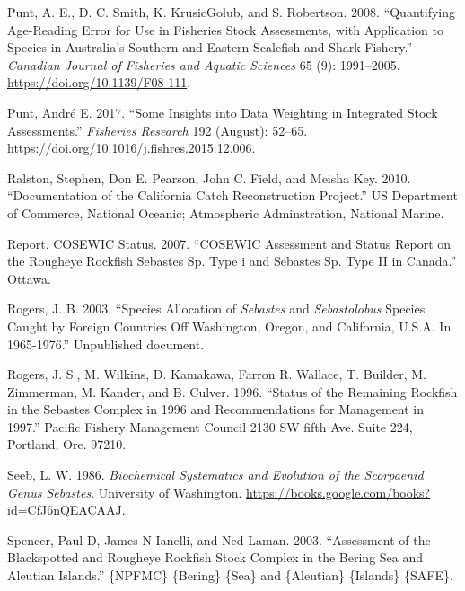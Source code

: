 \documentclass[
]{scrartcl}
\newlength{\cslhangindent}
\newenvironment{CSLReferences}[2] %
 {\begin{list}{}{%
  \setlength{\itemindent}{0pt}
  \setlength{\leftmargin}{0pt}
  \setlength{\parsep}{0pt}
  \ifodd #1
   \setlength{\leftmargin}{\cslhangindent}
   \setlength{\itemindent}{-1\cslhangindent}
  \fi
  \setlength{\itemsep}{#2\baselineskip}}}
 {\end{list}}
\begin{document}
\begin{CSLReferences}{1}{0}
Punt, A. E., D. C. Smith, K. KrusicGolub, and S. Robertson. 2008.
{``Quantifying Age-Reading Error for Use in Fisheries Stock Assessments,
with Application to Species in {A}ustralia's Southern and Eastern
Scalefish and Shark Fishery.''} \emph{Canadian Journal of Fisheries and
Aquatic Sciences} 65 (9): 1991--2005.
\url{https://doi.org/10.1139/F08-111}.

Punt, André E. 2017. {``Some Insights into Data Weighting in Integrated
Stock Assessments.''} \emph{Fisheries Research} 192 (August): 52--65.
\url{https://doi.org/10.1016/j.fishres.2015.12.006}.

Ralston, Stephen, Don E. Pearson, John C. Field, and Meisha Key. 2010.
{``Documentation of the {California} Catch Reconstruction Project.''} US
Department of Commerce, National Oceanic; Atmospheric Adminstration,
National Marine.

Report, COSEWIC Status. 2007. {``COSEWIC Assessment and Status Report on
the Rougheye Rockfish Sebastes Sp. Type i and Sebastes Sp. Type II in
Canada.''} Ottawa.

Rogers, J. B. 2003. {``Species Allocation of \emph{Sebastes} and
\emph{Sebastolobus} Species Caught by Foreign Countries Off
{Washington}, {Oregon}, and {California}, {U}.{S}.{A}. In 1965-1976.''}
Unpublished document.

Rogers, J. S., M. Wilkins, D. Kamakawa, Farron R. Wallace, T. Builder,
M. Zimmerman, M. Kander, and B. Culver. 1996. {``Status of the
{Remaining} {Rockfish} in the {Sebastes} {Complex} in 1996 and
Recommendations for Management in 1997.''} Pacific Fishery Management
Council 2130 SW fifth Ave. Suite 224, Portland, Ore. 97210.

Seeb, L. W. 1986. \emph{Biochemical {Systematics} and {Evolution} of the
{Scorpaenid} {Genus} {Sebastes}}. University of Washington.
\url{https://books.google.com/books?id=CfJ6nQEACAAJ}.

Spencer, Paul D, James N Ianelli, and Ned Laman. 2003. {``Assessment of
the {Blackspotted} and {Rougheye} {Rockfish} {Stock} {Complex} in the
{Bering} {Sea} and {Aleutian} {Islands}.''} \{NPFMC\} \{Bering\} \{Sea\}
and \{Aleutian\} \{Islands\} \{SAFE\}.


\end{CSLReferences}
\end{document}
